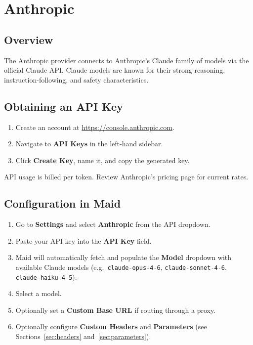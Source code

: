 \documentclass[12pt,a4paper]{article}
\begin{document}
\section{Anthropic}

\subsection{Overview}

The Anthropic provider connects to Anthropic's Claude family of models via the official Claude API. Claude models are known for their strong reasoning, instruction-following, and safety characteristics.

\subsection{Obtaining an API Key}

\begin{enumerate}
    \item Create an account at \url{https://console.anthropic.com}.
    \item Navigate to \textbf{API Keys} in the left-hand sidebar.
    \item Click \textbf{Create Key}, name it, and copy the generated key.
\end{enumerate}

API usage is billed per token. Review Anthropic's pricing page for current rates.

\subsection{Configuration in Maid}

\begin{enumerate}
    \item Go to \textbf{Settings} and select \textbf{Anthropic} from the API dropdown.
    \item Paste your API key into the \textbf{API Key} field.
    \item Maid will automatically fetch and populate the \textbf{Model} dropdown with available Claude models (e.g.\ \texttt{claude-opus-4-6}, \texttt{claude-sonnet-4-6}, \texttt{claude-haiku-4-5}).
    \item Select a model.
    \item Optionally set a \textbf{Custom Base URL} if routing through a proxy.
    \item Optionally configure \textbf{Custom Headers} and \textbf{Parameters} (see Sections~\ref{sec:headers} and~\ref{sec:parameters}).
\end{enumerate}
\end{document}
